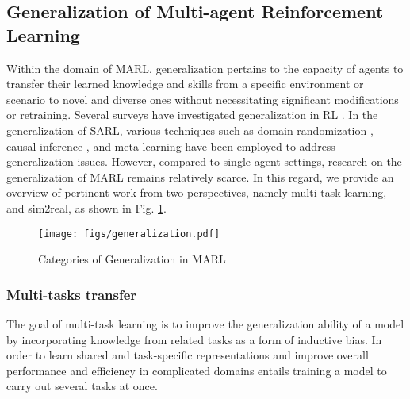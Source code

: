 \documentclass[acmsmall]{acmart}
\begin{document}
\subsection{Generalization of Multi-agent Reinforcement Learning}
Within the domain of MARL, generalization pertains to the capacity of agents to transfer their learned knowledge and skills from a specific environment or scenario to novel and diverse ones without necessitating significant modifications or retraining. Several surveys have investigated generalization in RL \cite{trustRL, 9308468, electronics9091363, 10.1613/jair.1.14174}. In the generalization of SARL, various techniques such as domain randomization \cite{7354126,rajeswaran2016epopt,Sadeghi_2018_CVPR}, causal inference \cite{ke2019learning, scherrer2021learning, pmlr-v119-zhang20t}, and meta-learning \cite{pmlr-v70-finn17a, 9196540,pmlr-v80-kaplanis18a} have been employed to address generalization issues. However, compared to single-agent settings, research on the generalization of MARL remains relatively scarce. In this regard, we provide an overview of pertinent work from two perspectives, namely multi-task learning, and sim2real, as shown in Fig. \ref{generalization}. %
\begin{figure}
    \centering
    \texttt{[image: figs/generalization.pdf]}
    \caption{Categories of Generalization in MARL}
    \label{generalization}
\end{figure}


\subsubsection{Multi-tasks transfer}
The goal of multi-task learning is to improve the generalization ability of a model by incorporating knowledge from related tasks as a form of inductive bias. In order to learn shared and task-specific representations and improve overall performance and efficiency in complicated domains entails training a model to carry out several tasks at once.
\end{document}
